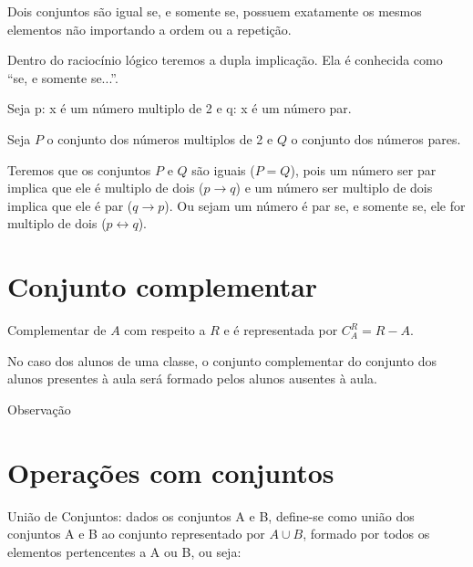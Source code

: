 Dois conjuntos são igual se, e somente se, possuem exatamente os mesmos elementos não importando a ordem ou a repetição.

Dentro do raciocínio lógico teremos a dupla implicação. Ela é conhecida como ``se, e somente se...''. 

Seja p: x é um número multiplo de 2 e q: x é um número par.

Seja $P$ o conjunto dos números multiplos de 2 e $Q$ o conjunto dos números pares. 

Teremos que os conjuntos $P$ e $Q$ são iguais ($P=Q$), pois um número ser par implica que ele é multiplo de dois ($p \rightarrow q$) e um número ser multiplo de dois implica que ele é par ($q \rightarrow p$). Ou sejam um número é par se, e somente se, ele for multiplo de dois ($p\leftrightarrow q$).

\section{Conjunto complementar}

Complementar de $A$ com respeito a $R$ e é representada por $C^R_A = R - A$.

No caso dos alunos de uma classe, o conjunto complementar do conjunto dos alunos presentes à aula será formado pelos alunos ausentes à aula.


{\huge Observação}

\section{Operações com conjuntos}

\begin{defi}   
União de Conjuntos: dados os conjuntos A e B, define-se como união dos conjuntos A e B ao conjunto representado por $A \cup B$, formado por todos os elementos pertencentes a A ou B, ou seja:
\end{defi}

\def\firstcircle{(0,0) circle (1.5cm)}
\def\secondcircle{(0:2cm) circle (1.5cm)}



